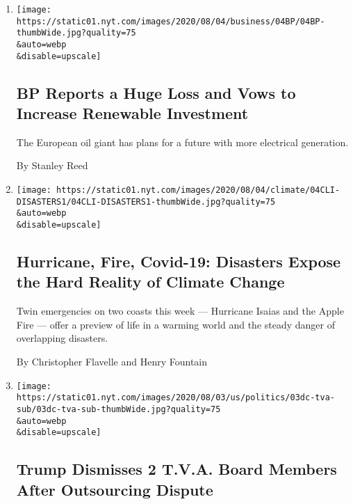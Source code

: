 \begin{enumerate}
\def\labelenumi{\arabic{enumi}.}
\item
  \href{/2020/08/04/business/energy-environment/bp-renewable-investment.html}{}

  \texttt{[image: https://static01.nyt.com/images/2020/08/04/business/04BP/04BP-thumbWide.jpg?quality=75\\\&auto=webp\\\&disable=upscale]}

  \hypertarget{bp-reports-a-huge-loss-and-vows-to-increase-renewable-investment}{%
  \subsection{BP Reports a Huge Loss and Vows to Increase Renewable
  Investment}\label{bp-reports-a-huge-loss-and-vows-to-increase-renewable-investment}}

  The European oil giant has plans for a future with more electrical
  generation.

  By Stanley Reed
\item
  \href{/2020/08/04/climate/hurricane-isaias-apple-fire-climate.html}{}

  \texttt{[image: https://static01.nyt.com/images/2020/08/04/climate/04CLI-DISASTERS1/04CLI-DISASTERS1-thumbWide.jpg?quality=75\\\&auto=webp\\\&disable=upscale]}

  \hypertarget{hurricane-fire-covid-19-disasters-expose-the-hard-reality-of-climate-change}{%
  \subsection{Hurricane, Fire, Covid-19: Disasters Expose the Hard
  Reality of Climate
  Change}\label{hurricane-fire-covid-19-disasters-expose-the-hard-reality-of-climate-change}}

  Twin emergencies on two coasts this week --- Hurricane Isaias and the
  Apple Fire --- offer a preview of life in a warming world and the
  steady danger of overlapping disasters.

  By Christopher Flavelle and Henry Fountain
\item
  \href{/2020/08/03/us/politics/trump-tennessee-valley-authority.html}{}

  \texttt{[image: https://static01.nyt.com/images/2020/08/03/us/politics/03dc-tva-sub/03dc-tva-sub-thumbWide.jpg?quality=75\\\&auto=webp\\\&disable=upscale]}

  \hypertarget{trump-dismisses-2-tva-board-members-after-outsourcing-dispute}{%
  \subsection{Trump Dismisses 2 T.V.A. Board Members After Outsourcing
  Dispute}\label{trump-dismisses-2-tva-board-members-after-outsourcing-dispute}}


\end{enumerate}
